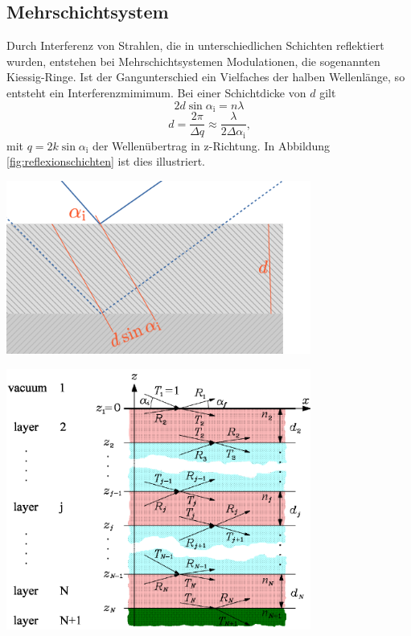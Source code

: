 \documentclass[captions=tableheading]{scrartcl}
\newcommand{\indx}[1]{\text{#1}}
\begin{document}
\subsection{Mehrschichtsystem}
Durch Interferenz von Strahlen, die in unterschiedlichen Schichten reflektiert wurden, entstehen bei Mehrschichtsystemen Modulationen, die sogenannten Kiessig-Ringe.
Ist der Gangunterschied ein Vielfaches der halben Wellenlänge, so entsteht ein Interferenzmimimum. 
Bei einer Schichtdicke von $d$ gilt
\begin{equation}
2d\sin \alpha_{\indx{i}} =n\lambda
\end{equation}
\begin{equation}
d=\frac{2\pi}{\Delta q}\approx \frac{\lambda}{2\Delta\alpha_{\indx{i}}}\text{,}
\end{equation}
mit $q=2k\sin \alpha_{\indx{i}}$ der Wellenübertrag in z-Richtung. In Abbildung \ref{fig:reflexionschichten} ist dies illustriert.
\begin{center}
	\includegraphics[width=10cm]{images/reflexionschichten.png}
	\label{fig:reflexionschichten}
\end{center}
\begin{center}
	\includegraphics[width=10cm]{images/reflexionmehrschichten.png}
	\label{fig:reflexionmehrschichten}
\end{center}
\end{document}
